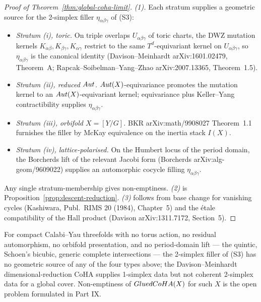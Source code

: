 \begin{proof}[Proof of Theorem~\ref{thm:global-coha-limit}]
\emph{(1).} Each stratum supplies a geometric source for the
2-simplex filler $\eta_{\alpha\beta\gamma}$ of (S3):
\begin{itemize}
\item \emph{Stratum (i), toric.} On triple overlaps
  $U_{\alpha\beta\gamma}$ of toric charts, the DWZ mutation kernels
  $K_{\alpha\beta}, K_{\beta\gamma}, K_{\alpha\gamma}$ restrict to
  the same $T^d$-equivariant kernel on $U_{\alpha\beta\gamma}$, so
  $\eta_{\alpha\beta\gamma}$ is the canonical identity
  (Davison--Meinhardt arXiv:1601.02479, Theorem~A;
  Rapcak--Soibelman--Yang--Zhao arXiv:2007.13365, Theorem~1.5).
\item \emph{Stratum (ii), reduced $Aut$.} $Aut(X)$-equivariance
  promotes the mutation kernel to an $Aut(X)$-equivariant kernel;
  equivariance plus Keller--Yang contractibility supplies
  $\eta_{\alpha\beta\gamma}$.
\item \emph{Stratum (iii), orbifold $X = [Y/G]$.} BKR
  arXiv:math/9908027 Theorem~1.1 furnishes the filler by McKay
  equivalence on the inertia stack $I(X)$.
\item \emph{Stratum (iv), lattice-polarised.} On the Humbert locus
  of the period domain, the Borcherds lift of the relevant Jacobi
  form (Borcherds arXiv:alg-geom/9609022) supplies an automorphic
  cocycle filling $\eta_{\alpha\beta\gamma}$.
\end{itemize}
Any single stratum-membership gives non-emptiness.
\emph{(2)} is Proposition~\ref{prop:descent-reduction}.
\emph{(3)} follows from base change for vanishing cycles
(Kashiwara, Publ.~RIMS 20 (1984), Chapter~5) and the étale
compatibility of the Hall product
(Davison arXiv:1311.7172, Section~5).
\end{proof}

\begin{remark}
\label{rem:non-emptiness-conditional}
For compact Calabi--Yau threefolds with no torus action, no
residual automorphism, no orbifold presentation, and no
period-domain lift --- the quintic, Schoen's bicubic, generic
complete intersections --- the 2-simplex filler of (S3) has no
geometric source of any of the four types above; the
Davison--Meinhardt dimensional-reduction CoHA supplies 1-simplex
data but not coherent 2-simplex data for a global cover.
Non-emptiness of $GluedCoHA(X)$ for such $X$ is the open problem
formulated in Part IX.
\end{remark}

